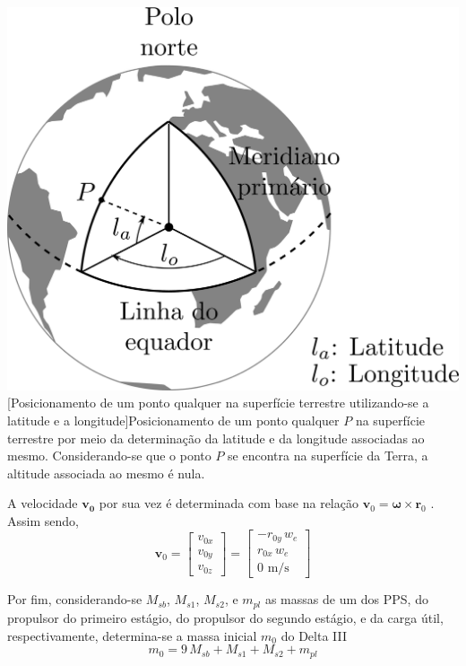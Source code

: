 \noindent	
\begin{minipage}{\textwidth}
	\vspace{\onelineskip}
	\centering
	\includegraphics[width=0.65\linewidth]{draw/resultados/pdf/coordenadasLaLo}
	[Posicionamento de um ponto qualquer na superfície terrestre utilizando-se a latitude e a longitude]{Posicionamento de um ponto qualquer $ P $ na superfície terrestre por meio da determinação da latitude e da longitude associadas ao mesmo. Considerando-se que o ponto $ P $ se encontra na superfície da Terra, a altitude associada ao mesmo é nula.}
	\label{fig:foguete:latitudeLongitude}
	\vspace{\onelineskip}
\end{minipage}

A velocidade $ \mathbf{v_0} $ por sua vez é determinada com base na relação $ \mathbf{v}_0 = {\bm \omega} \times \mathbf{r}_0 $ \cite{becerra_psopt_2019}. Assim sendo, 
%
\begin{equation}
	\mathbf{v}_0 = 
	\begin{bmatrix}
		v_{0x} \\
		v_{0y} \\
		v_{0z}
	\end{bmatrix} = 
	\begin{bmatrix}
		- r_{0y} \, w_e \\
		r_{0x} \, w_e \\
		0 \text{ m/s}
	\end{bmatrix}
\end{equation}

Por fim, considerando-se $ M_{sb} $, $ M_{s1} $, $ M_{s2} $, e $ m_{pl} $ as massas de um dos PPS, do propulsor do primeiro estágio, do propulsor do segundo estágio, e da carga útil, respectivamente, determina-se a massa inicial $ m_0 $ do Delta III \cite{becerra_psopt_2019}
%
\begin{equation}
	m_0 = 9 \, M_{sb} + M_{s1} + M_{s2} + m_{pl}
\end{equation}

